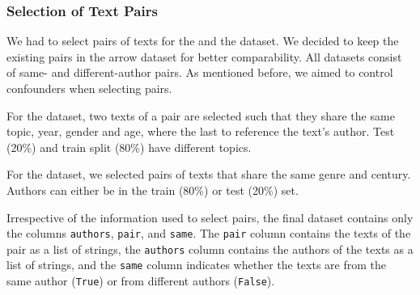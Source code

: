 \subsubsection{Selection of Text Pairs}
\label{subsubsec:dataset_text_pair_selection}

We had to select pairs of texts for the \dataBlog{} and the \dataGutenberg{} dataset.
We decided to keep the existing pairs in the \dataPan{} arrow dataset for better comparability.
All datasets consist of same- and different-author pairs. 
As mentioned before, we aimed to control confounders when selecting pairs.

For the \dataBlog{} dataset, 
two texts of a pair are selected such that they share the same topic, year, gender and age, where the last to reference the text's author.
Test (20\%) and train split (80\%) have different topics.

For the \dataGutenberg{} dataset,
we selected pairs of texts that share the same genre and century.
Authors can either be in the train (80\%) or test (20\%) set.

Irrespective of the information used to select pairs, the final dataset contains only the columns \texttt{authors}, \texttt{pair}, and \texttt{same}.
The \texttt{pair} column contains the texts of the pair as a list of strings,
the \texttt{authors} column contains the authors of the texts as a list of strings,
and the \texttt{same} column indicates whether the texts are from the same author (\texttt{True}) or from different authors (\texttt{False}).
